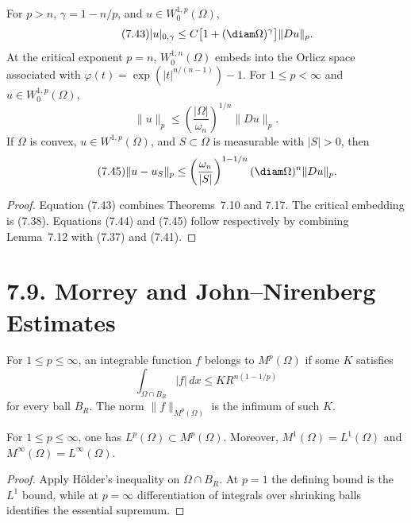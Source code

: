 \begin{corollary}
\label{gt:cor-sobolev-global-estimates}
For $p>n$, $\gamma=1-n/p$, and $u\in W_0^{1,p}(\Omega)$,
\begin{equation}
\tag{7.43}
|u|_{0,\gamma}\leq C\bigl[1+(\diam\Omega)^\gamma\bigr]\|Du\|_p.
\end{equation}
At the critical exponent $p=n$, $W_0^{1,n}(\Omega)$ embeds into the Orlicz
space associated with
$\varphi(t)=\exp(|t|^{n/(n-1)})-1$.
For $1\leq p<\infty$ and $u\in W_0^{1,p}(\Omega)$,
\begin{equation}
\tag{7.44}
\|u\|_p\leq\left(\frac{|\Omega|}{\omega_n}\right)^{1/n}\|Du\|_p.
\end{equation}
If $\Omega$ is convex, $u\in W^{1,p}(\Omega)$, and
$S\subset\Omega$ is measurable with $|S|>0$, then
\begin{equation}
\tag{7.45}
\|u-u_S\|_p\leq
\left(\frac{\omega_n}{|S|}\right)^{1-1/n}
(\diam\Omega)^n\|Du\|_p.
\end{equation}
\end{corollary}
\begin{proof}
\sketch Equation (7.43) combines Theorems~7.10 and 7.17. The critical
embedding is (7.38). Equations (7.44) and (7.45) follow respectively by
combining Lemma~7.12 with (7.37) and (7.41).
\end{proof}

\section*{7.9. Morrey and John--Nirenberg Estimates}
\label{gt:sec-morrey-john-nirenberg}

\begin{definition}
\label{gt:def-sobolev-morrey-space}
For $1\leq p\leq\infty$, an integrable function $f$ belongs to
$M^p(\Omega)$ if some $K$ satisfies
\begin{equation}
\tag{7.46}
\int_{\Omega\cap B_R}|f|\,dx\leq KR^{n(1-1/p)}
\end{equation}
for every ball $B_R$. The norm $\|f\|_{M^p(\Omega)}$ is the infimum of such
$K$.
\end{definition}

\begin{proposition}
\label{gt:prop-sobolev-morrey-inclusions}
For $1\leq p\leq\infty$, one has $L^p(\Omega)\subset M^p(\Omega)$.
Moreover, $M^1(\Omega)=L^1(\Omega)$ and
$M^\infty(\Omega)=L^\infty(\Omega)$.
\end{proposition}
\begin{proof}
\sketch Apply H\"older's inequality on $\Omega\cap B_R$. At $p=1$ the
defining bound is the $L^1$ bound, while at $p=\infty$ differentiation of
integrals over shrinking balls identifies the essential supremum.
\end{proof}

